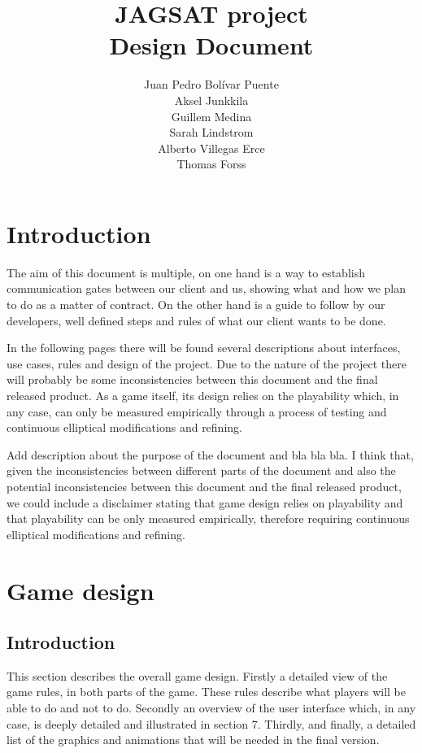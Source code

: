 \documentclass[12pt,a4paper]{article}
\title{\large JAGSAT project\\\huge Design Document}
\author{
  Juan Pedro Bolívar Puente\\ 
  Aksel Junkkila\\
  Guillem Medina\\ 
  Sarah Lindstrom\\ 
  Alberto Villegas Erce\\ 
  Thomas Forss
}
\let\stdsection\section
\renewcommand\section{\newpage\stdsection}
\begin{document}
\maketitle

\tableofcontents
\pagebreak

\section{Introduction}

The aim of this document is multiple, on one hand is a way to establish 
communication gates between our client and us, showing what and how
we plan to do as a matter of contract. On the other hand is a guide to
follow by our developers, well defined steps and rules of what our
client wants to be done.
 
In the following pages there will be found several descriptions about 
interfaces, use cases, rules and design of the project. Due to the nature of 
the project there will probably be some inconsistencies between this
document and the final released product. As a game itself, its design
relies on the playability which, in any case, can only be measured
empirically through a process of testing and continuous elliptical
modifications and refining.
 
\begin{todo}
  Add description about the purpose of the document and bla bla bla. I
  think that, given the inconsistencies between different parts of the
  document and also the potential inconsistencies between this
  document and the final released product, we could include a
  disclaimer stating that game design relies on playability and that
  playability can be only measured empirically, therefore requiring
  continuous elliptical modifications and refining. 
\end{todo}

\section{Game design}

\subsection{Introduction}

This section describes the overall game design. Firstly a detailed view
of the game rules, in both parts of the game. These rules describe what
players will be able to do and not to do. Secondly an overview of the
user interface which, in any case, is deeply detailed and illustrated in
section 7. Thirdly, and finally, a detailed list of the graphics and 
animations that will be needed in the final version.
\end{document}
